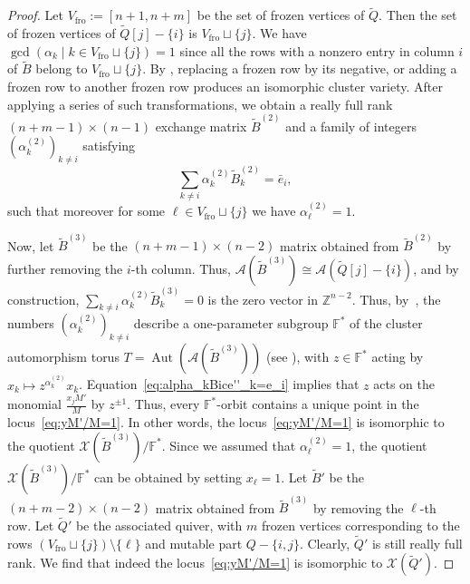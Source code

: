\documentclass[11pt]{article}
\theoremstyle{definition}
\numberwithin{equation}{section}
\newcommand\Acal{\mathcal{A}}\newcommand\Bcal{\mathcal{B}}\newcommand\Ccal{\mathcal{C}}\newcommand\Dcal{\mathcal{D}}\newcommand\Ecal{\mathcal{E}}\newcommand\Fcal{\mathcal{F}}\newcommand\Gcal{\mathcal{G}}\newcommand\Hcal{\mathcal{H}}\newcommand\Ical{\mathcal{I}}\newcommand\Jcal{\mathcal{J}}\newcommand\Kcal{\mathcal{K}}\newcommand\Lcal{\mathcal{L}}\newcommand\Mcal{\mathcal{M}}\newcommand\Ncal{\mathcal{N}}\newcommand\Ocal{\mathcal{O}}\newcommand\Pcal{\mathcal{P}}\newcommand\Qcal{\mathcal{Q}}\newcommand\Rcal{\mathcal{R}}\newcommand\Scal{\mathcal{S}}\newcommand\Tcal{\mathcal{T}}\newcommand\Ucal{\mathcal{U}}\newcommand\Vcal{\mathcal{V}}\newcommand\Wcal{\mathcal{W}}\newcommand\Xcal{\mathcal{X}}\newcommand\Ycal{\mathcal{Y}}\newcommand\Zcal{\mathcal{Z}}
\newcommand\Z{\mathbb{Z}}
\newcommand\Qice{\widetilde{Q}}
\newcommand\F{\mathbb{F}}
\newcommand\fro{\operatorname{fro}}
\newcommand\Vfro{V_{\fro}}
\def\Qicefr[#1]{\Qice[#1]}
\newcommand\Bice{\widetilde{B}}
\newcommand\bice{\tilde{B}}
\newcommand\AX{\Acal}
\newcommand\Gm{\F^\ast}
\newcommand\Aut{\operatorname{Aut}}
\newcommand\pB{^{(2)}}
\newcommand\pC{^{(3)}}
\begin{document}
\begin{proof}
Let $\Vfro:=[n+1,n+m]$ be the set of frozen vertices of $\Qice$. Then the set of frozen vertices of $\Qicefr[j]-\{i\}$ is $\Vfro\sqcup\{j\}$.  We have $\gcd(\alpha_k\mid k\in \Vfro\sqcup\{j\})=1$
%
 since all the rows with a nonzero entry in column $i$ of $\Bice$ belong to $\Vfro\sqcup\{j\}$.  By \cite[Section 5]{LS}, replacing a frozen row by its negative, or adding a frozen row to another frozen row produces an isomorphic cluster variety.  After applying a series of such transformations, we obtain a really full rank $(n+m-1)\times(n-1)$ exchange matrix $\Bice\pB$ and a family of integers $(\alpha\pB_k)_{k\neq i}$ satisfying 
   \begin{equation}\label{eq:alpha_kBice''_k=e_i}
    \sum_{k\neq i} \alpha\pB_k \bice\pB_k=\bar e_i,
  \end{equation}
such that moreover for some $\ell\in\Vfro\sqcup\{j\}$ we have $\alpha\pB_\ell=1$. 

Now, let $\Bice\pC$ be the $(n+m-1)\times(n-2)$ matrix obtained from $\Bice\pB$ by further removing the $i$-th column. Thus, $\AX(\Bice\pC)\cong \AX(\Qicefr[j] - \{i\})$, and by construction, $\sum_{k\neq i} \alpha\pB_k\bice\pC_k=0$ is the zero vector in $\Z^{n-2}$.  Thus, by~\cite[Proposition 5.1]{LS}, the numbers $(\alpha\pB_k)_{k\neq i}$ describe a one-parameter subgroup $\Gm$ of the cluster automorphism torus $T=\Aut(\AX(\Bice\pC))$ (see \cite[Section 5]{LS}), with $z\in\Gm$ acting by $x_k\mapsto z^{\alpha\pB_k}x_k$. Equation~\eqref{eq:alpha_kBice''_k=e_i} implies that $z$ acts on the monomial $\frac{x_jM'}{M}$ by $z^{\pm 1}$. Thus, every $\Gm$-orbit contains a unique point in the locus~\eqref{eq:yM'/M=1}. In other words, the locus~\eqref{eq:yM'/M=1} is isomorphic to the quotient $\Xcal(\Bice\pC)/\Gm$.  Since we assumed that $\alpha\pB_\ell = 1$, the quotient $\Xcal(\Bice\pC)/\Gm$ can be obtained by setting $x_\ell=1$.  Let $\Bice'$ be the $(n+m-2)\times(n-2)$ matrix obtained from $\Bice\pC$ by removing the $\ell$-th row. Let $\Qice'$ be the associated quiver, with $m$ frozen vertices corresponding to the rows $(\Vfro\sqcup\{j\})\setminus\{\ell\}$ and mutable part $Q-\{i,j\}$. Clearly, $\Qice'$ is still really full rank. We find that indeed the locus~\eqref{eq:yM'/M=1} is isomorphic to $\Xcal(\Qice')$.
%
%
\end{proof}
\end{document}
